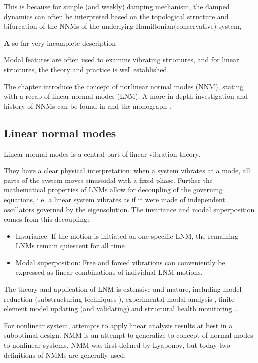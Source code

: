 This is because for simple (and weekly) damping mechanism, the damped dynamics
can often be interpreted based on the topological structure and bifurcation of
the NNMs of the underlying Hamiltonian(conservative) system,
\autocite[sec. 4]{renson2016a}

{\textbf A so far very incomplete description}

Modal features are often used to examine vibrating structures, and for linear
structures, the theory and practice is well established.

The chapter introduce the concept of nonlinear normal modes (NNM), stating with
a recap of linear normal modes (LNM). A more in-depth investigation and history
of NNMs can be found in \autocite{kerschen2009a} and the monograph \autocite[chap
2.]{vakakis2008a}.


\subsection{Linear normal modes}
\label{sec:linear-normal-modes}


Linear normal modes is a central part of linear vibration theory.

They have a clear physical interpretation: when a system vibrates at a mode, all
parts of the system moves sinusoidal with a fixed phase.
Further the mathematical properties of LNMs allow for decoupling of the
governing equations, i.e. a linear system vibrates as if it were made of
independent oscillators governed by the eigensolution. The invariance and modal
superposition comes from this decoupling:

\begin{itemize}
\item Invariance: If the motion is initiated on one specific LNM, the remaining
  LNMs remain quiescent for all time
\item Modal superposition: Free and forced vibrations can conveniently be
  expressed as linear combinations of individual LNM motions.
\end{itemize}

The theory and application of LNM is extensive and mature, including model
reduction (substructuring techniques \autocite{craig1968a}), experimental modal
analysis \autocite{ewins2000a}, finite element model updating (and
validating)\autocite{friswell1995a} and structural health monitoring
\autocite{doebling1996damage}.



For nonlinear system, attempts to apply linear analysis results at best in a
suboptimal design. NMM is an attempt to generalize to concept of normal modes to
nonlinear systems. NMM was first defined by Lyaponov, but today two definitions
of NMMs are generally used:


